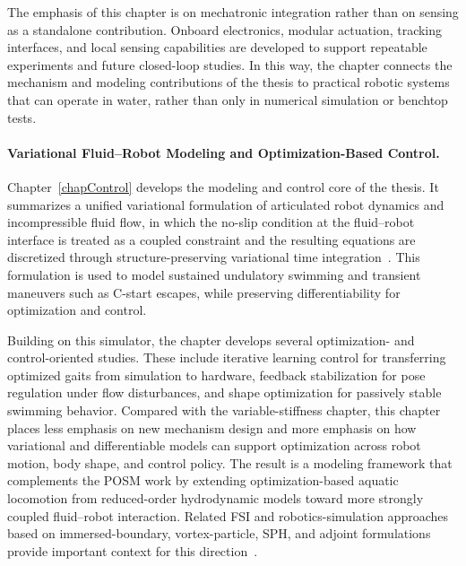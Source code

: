 The emphasis of this chapter is on mechatronic integration rather than on sensing as a standalone contribution. Onboard electronics, modular actuation, tracking interfaces, and local sensing capabilities are developed to support repeatable experiments and future closed-loop studies. In this way, the chapter connects the mechanism and modeling contributions of the thesis to practical robotic systems that can operate in water, rather than only in numerical simulation or benchtop tests.

\paragraph{Variational Fluid--Robot Modeling and Optimization-Based Control.}
Chapter~\ref{chapControl} develops the modeling and control core of the thesis. It summarizes a unified variational formulation of articulated robot dynamics and incompressible fluid flow, in which the no-slip condition at the fluid--robot interface is treated as a coupled constraint and the resulting equations are discretized through structure-preserving variational time integration~\cite{seligerVariationalPrinciplesContinuum1968a,marsden2001discrete,hairer2006geometric,lee2023aquarium,lee2026realizingroboticswimmingunified}. This formulation is used to model sustained undulatory swimming and transient maneuvers such as C-start escapes, while preserving differentiability for optimization and control.

Building on this simulator, the chapter develops several optimization- and control-oriented studies. These include iterative learning control for transferring optimized gaits from simulation to hardware, feedback stabilization for pose regulation under flow disturbances, and shape optimization for passively stable swimming behavior. Compared with the variable-stiffness chapter, this chapter places less emphasis on new mechanism design and more emphasis on how variational and differentiable models can support optimization across robot motion, body shape, and control policy. The result is a modeling framework that complements the POSM work by extending optimization-based aquatic locomotion from reduced-order hydrodynamic models toward more strongly coupled fluid--robot interaction. Related FSI and robotics-simulation approaches based on immersed-boundary, vortex-particle, SPH, and adjoint formulations provide important context for this direction~\cite{battistaIB2dPythonMATLAB2017a,bernierSimulationsPropellingEnergy2019a,bazilevsAdjointbasedControlFluidStructure2013,arranzFluidStructureInteraction2022,angelidisSmoothedParticleHydrodynamics2025}.

